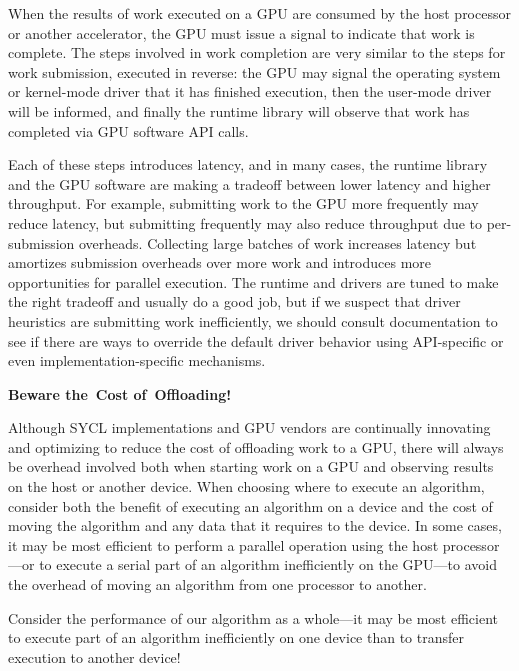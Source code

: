 When the results of work executed on a GPU are consumed by the host processor or another accelerator, the GPU must issue a signal to indicate that work is complete. The steps involved in work completion are very similar to the steps for work submission, executed in reverse: the GPU may signal the operating system or kernel-mode driver that it has finished execution, then the user-mode driver will be informed, and finally the runtime library will observe that work has completed via GPU software API calls.\par

Each of these steps introduces latency, and in many cases, the runtime library and the GPU software are making a tradeoff between lower latency and higher throughput. For example, submitting work to the GPU more frequently may reduce latency, but submitting frequently may also reduce throughput due to per-submission overheads. Collecting large batches of work increases latency but amortizes submission overheads over more work and introduces more opportunities for parallel execution. The runtime and drivers are tuned to make the right tradeoff and usually do a good job, but if we suspect that driver heuristics are submitting work inefficiently, we should consult documentation to see if there are ways to override the default driver behavior using API-specific or even implementation-specific mechanisms.\par

\hspace*{\fill} \par %
\textbf{Beware the Cost of Offloading!}

Although SYCL implementations and GPU vendors are continually innovating and optimizing to reduce the cost of offloading work to a GPU, there will always be overhead involved both when starting work on a GPU and observing results on the host or another device. When choosing where to execute an algorithm, consider both the benefit of executing an algorithm on a device and the cost of moving the algorithm and any data that it requires to the device. In some cases, it may be most efficient to perform a parallel operation using the host processor—or to execute a serial part of an algorithm inefficiently on the GPU—to avoid the overhead of moving an algorithm from one processor to another.\par

\begin{tcolorbox}[colback=red!5!white,colframe=red!75!black]
Consider the performance of our algorithm as a whole—it may be most efficient to execute part of an algorithm inefficiently on one device than to transfer execution to another device!
\end{tcolorbox}

